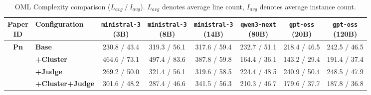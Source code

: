 \begin{table}[htbp]
    \centering
    \small
    \setlength{\tabcolsep}{4pt}
    \caption{OML Complexity comparison ($L_{avg}~/~I_{avg}$). $L_{avg}$ denotes average line count, $I_{avg}$ denotes average instance count.}
    \begin{tabular}{c|l|cccccc}
        \hline
        \makecell{\textbf{Paper} \\ \textbf{ID}} & \textbf{Configuration} & \makecell{\texttt{ministral-3} \\ (3B)} & \makecell{\texttt{ministral-3} \\ (8B)} & \makecell{\texttt{ministral-3} \\ (14B)} & \makecell{\texttt{qwen3-next} \\ (80B)} & \makecell{\texttt{gpt-oss} \\ (20B)} & \makecell{\texttt{gpt-oss} \\ (120B)} \\
        \hline
        
        \multirow{4}{*}{\textbf{Pn}} 
          & \textbf{Base} & 230.8 / 43.4 & 319.3 / 56.1 & 317.6 / 59.4 & 232.7 / 51.1 & 218.4 / 46.5 & 242.5 / 46.5\\
          & \textbf{+Cluster} & 464.6 / 73.1 & 497.4 / 83.6 & 387.8 / 59.8 & 164.4 / 36.1 & 143.2 / 29.4 & 191.4 / 37.4\\
          & \textbf{+Judge} & 269.2 / 50.0 & 321.4 / 56.1 & 319.6 / 58.5 & 224.4 / 48.5 & 240.9 / 50.4 & 248.5 / 47.9\\
          & \textbf{+Cluster+Judge} & 301.6 / 48.2 & 287.4 / 46.6 & 341.5 / 56.3 & 210.3 / 46.7 & 179.6 / 37.7 & 187.8 / 36.8\\
        \hline
        
    \end{tabular}
    \label{tab:complexity_pn}
\end{table}